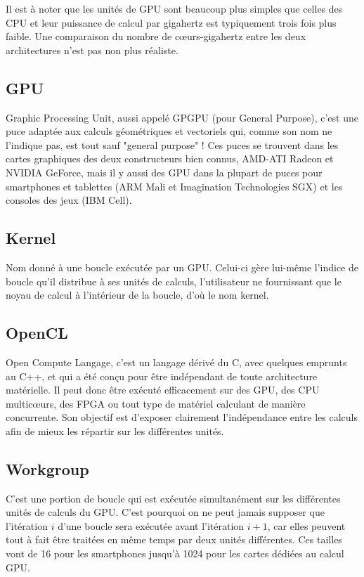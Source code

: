 \documentclass[a4paper,12pt]{article}
\begin{document}
Il est à noter que les unités de GPU sont beaucoup plus simples que celles des CPU et leur puissance de calcul par gigahertz est typiquement trois fois plus faible. Une comparaison du nombre de c\oe urs-gigahertz entre les deux architectures n'est pas non plus réaliste.

\subsection{GPU}
Graphic Processing Unit, aussi appelé GPGPU (pour General Purpose), c'est une puce adaptée aux calculs géométriques et vectoriels qui, comme son nom ne l'indique pas, est tout sauf "general purpose" !
Ces puces se trouvent dans les cartes graphiques des deux constructeurs bien connus, AMD-ATI Radeon et NVIDIA GeForce, mais il y aussi des GPU dans la plupart de puces pour smartphones et tablettes (ARM Mali et Imagination Technologies SGX) et les consoles des jeux (IBM Cell).

\subsection{Kernel}
Nom donné à une boucle exécutée par un GPU. Celui-ci gère lui-même l'indice de boucle qu'il distribue à ses unités de calculs, l'utilisateur ne fournissant que le noyau de calcul à l'intérieur de la boucle, d'où le nom kernel.

\subsection{OpenCL}
Open Compute Langage, c'est un langage dérivé du C, avec quelques emprunts au C++, et qui a été conçu pour être indépendant de toute architecture matérielle. Il peut donc être exécuté efficacement sur des GPU, des CPU multic\oe urs, des FPGA ou tout type de matériel calculant de manière concurrente. Son objectif est d'exposer clairement l'indépendance entre les calculs afin de mieux les répartir sur les différentes unités.

\subsection{Workgroup}
C'est une portion de boucle qui est exécutée simultanément sur les différentes unités de calculs du GPU. C'est pourquoi on ne peut jamais supposer que l'itération $i$ d'une boucle sera exécutée avant l'itération $i+1$, car elles peuvent tout à fait être traitées en même temps par deux unités différentes. Ces tailles vont de 16 pour les smartphones jusqu'à 1024 pour les cartes dédiées au calcul GPU.
\end{document}
